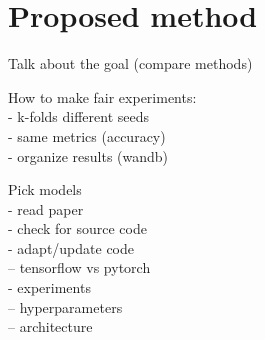\section{Proposed method}
Talk about the goal (compare methods)

How to make fair experiments:\\
  - k-folds different seeds\\
  - same metrics (accuracy)\\
  - organize results (wandb)

Pick models\\
 - read paper\\
 - check for source code\\
 - adapt/update code\\
 -- tensorflow vs pytorch\\
 - experiments\\
 -- hyperparameters\\
 -- architecture\\




